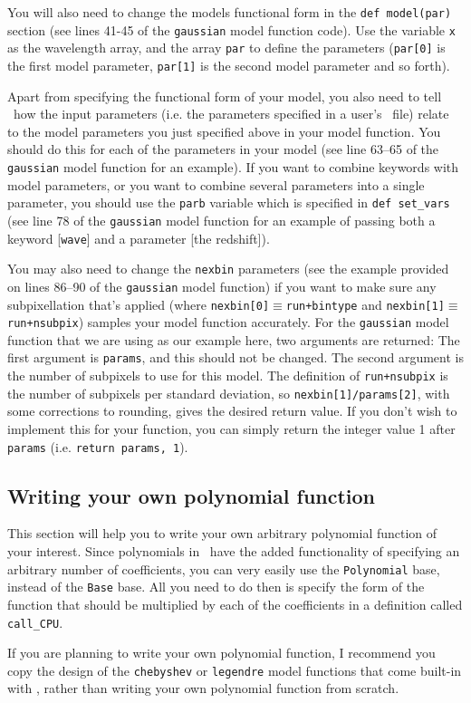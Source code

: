 You will also need to change the models functional form
in the \texttt{def model(par)} section (see lines 41-45 of
the \texttt{gaussian} model function code). Use the variable
\texttt{x} as the wavelength array, and the array \texttt{par}
to define the parameters (\texttt{par[0]} is the first model
parameter, \texttt{par[1]} is the second model parameter
and so forth).

Apart from specifying the functional form of your model, you also
need to tell \alis\ how the input parameters (i.e. the parameters
specified in a user's \dmod\ file) relate to the model parameters
you just specified above in your model function. You should do
this for each of the parameters in your model (see line 63--65
of the \texttt{gaussian} model function for an example).
If you want to combine keywords with model parameters, or you
want to combine several parameters into a single parameter, you
should use the \texttt{parb} variable which is specified in
\texttt{def set\_vars} (see line 78 of the \texttt{gaussian} model
function for an example of passing both a keyword [\texttt{wave}]
and a parameter [the redshift]).

You may also need to change the \texttt{nexbin} parameters (see
the example provided on lines 86--90 of the \texttt{gaussian} model
function) if you want to make sure any subpixellation that's applied
(where \texttt{nexbin[0]}$\equiv$\texttt{run+bintype} and
\texttt{nexbin[1]}$\equiv$\texttt{run+nsubpix}) samples your
model function accurately. For the \texttt{gaussian} model function
that we are using as our example here, two arguments are returned:
The first argument is \texttt{params}, and this should not be changed.
The second argument is the number of subpixels to use for this model.
The definition of \texttt{run+nsubpix} is the number of subpixels per
standard deviation, so \texttt{nexbin[1]/params[2]}, with some corrections
to rounding, gives the desired return value. If you don't wish to implement
this for your function, you can simply return the integer value 1 after
\texttt{params} (i.e. \texttt{return params, 1}).

\subsection{Writing your own polynomial function}
\label{sec:wrtpoly}

This section will help you to write your own arbitrary
polynomial function of your interest. Since polynomials
in \alis\ have the added functionality of specifying
an arbitrary number of coefficients, you can very easily
use the \texttt{Polynomial} base, instead of the \texttt{Base}
base.  All you need to do then is specify the form of the
function that should be multiplied by each of the coefficients
in a definition called \texttt{call\_CPU}.

If you are planning to write your own polynomial function,
I recommend you copy the design of the \texttt{chebyshev}
or \texttt{legendre} model functions that come built-in with \alis,
rather than writing your own polynomial function from scratch.
